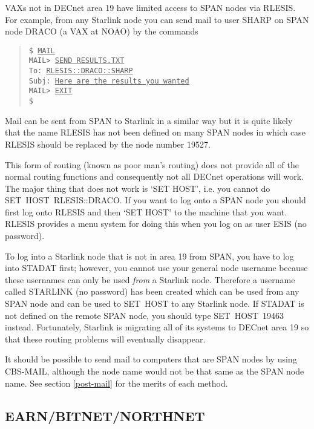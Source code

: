 VAXs not in DECnet area 19 have limited access to SPAN nodes via RLESIS. For
example, from any Starlink node you can send mail to user SHARP on SPAN node
DRACO (a VAX at NOAO) by the commands
\begin{quote}
{\tt \$ \underline{MAIL}\\[\medskipamount]
MAIL> \underline{SEND RESULTS.TXT}\\
To:     \underline{RLESIS::DRACO::SHARP}\\
Subj:   \underline{Here are the results you wanted}\\[\medskipamount]
MAIL> \underline{EXIT}\\[\medskipamount]
\$}
\end{quote}
Mail can be sent from SPAN to Starlink in a similar way but
it is quite likely that the name RLESIS has not been defined on many SPAN
nodes in which case RLESIS should be replaced by the node number 19527.

This form of routing (known as poor man's routing) does not provide all of the
normal routing functions and consequently not all DECnet operations will work.
The major thing that does not work is `SET HOST', i.e. you cannot do
SET~HOST~RLESIS::DRACO. If you want to log onto a SPAN node you should first
log onto RLESIS and then `SET HOST' to the machine that you want. RLESIS
provides a menu system for doing this when you log on as user ESIS (no
password).

To log into a Starlink node that is not in area 19 from SPAN, you have to log
into STADAT first; however, you cannot use your general node username because
these usernames can only be used {\em from} a Starlink node. Therefore a
username called STARLINK (no password) has been created which can be used from
any SPAN node and can be used to SET~HOST to any Starlink node. If STADAT is
not defined on the remote SPAN node, you should type SET~HOST~19463 instead.
Fortunately, Starlink is migrating all of its systems to DECnet area 19 so that
these routing problems will eventually disappear.

It should be possible to send mail to computers that are SPAN nodes by using
CBS-MAIL, although the node name would not be that same as the SPAN node name.
See section \ref{post-mail} for the merits of each method.

\subsection{EARN/BITNET/NORTHNET}
\label{bitnet}

